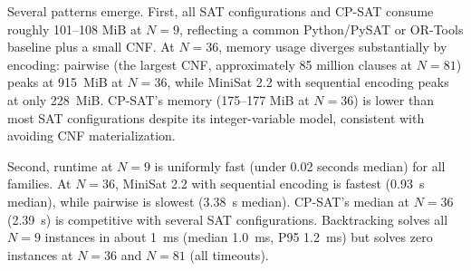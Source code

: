 \documentclass[a4paper,fleqn]{cas-sc}
\begin{document}
\begin{table}[htbp]
\centering
\caption{Peak memory usage (MiB) over solved runs only, by solver configuration and grid size \(N\). Count is the number of solved runs. ``---'' denotes no valid solves or no memory data.}
\label{tab:memory}
\small
\setlength{\tabcolsep}{4pt}
\end{table}

Several patterns emerge. First, all SAT configurations and CP-SAT consume roughly 101--108 MiB at \(N=9\), reflecting a common Python/PySAT or OR-Tools baseline plus a small CNF. At \(N=36\), memory usage diverges substantially by encoding: pairwise (the largest CNF, approximately 85 million clauses at \(N=81\)) peaks at 915~MiB at \(N=36\), while MiniSat 2.2 with sequential encoding peaks at only 228~MiB. CP-SAT's memory (175--177 MiB at \(N=36\)) is lower than most SAT configurations despite its integer-variable model, consistent with avoiding CNF materialization.

Second, runtime at \(N=9\) is uniformly fast (under 0.02 seconds median) for all families. At \(N=36\), MiniSat 2.2 with sequential encoding is fastest (0.93~s median), while pairwise is slowest (3.38~s median). CP-SAT's median at \(N=36\) (2.39~s) is competitive with several SAT configurations. Backtracking solves all \(N=9\) instances in about 1~ms (median 1.0~ms, P95 1.2~ms) but solves zero instances at \(N=36\) and \(N=81\) (all timeouts).
\end{document}
